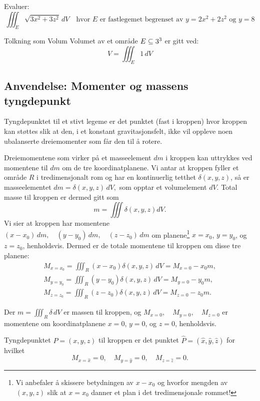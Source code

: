 \begin{eks}{}
Evaluer:
\[
\iiint_E \sqrt{3x^2 + 3z^2}\, dV \quad \text{hvor } E \text{ er fastlegemet begrenset av } y = 2x^2 + 2z^2 \text{ og } y = 8
\]
\end{eks}

\begin{rem}{Tolkning som Volum} Volumet av et område $E \subseteq 3^3$ er gitt ved:
\[
V = \iiint_E 1\, dV
\]
\end{rem}

\subsection*{Anvendelse: Momenter og massens tyngdepunkt}

Tyngdepunktet til et stivt legeme er det punktet (fast i kroppen) hvor kroppen kan støttes slik at den, i et konstant gravitasjonsfelt, ikke vil oppleve noen ubalanserte dreiemomenter som får den til å rotere.

Dreiemomentene som virker på et masseelement \( dm \) i kroppen kan uttrykkes ved momentene til \( dm \) om de tre koordinatplanene. Vi antar at kroppen fyller et område \( R \) i tredimensjonalt rom og har en kontinuerlig tetthet \( \delta(x, y, z) \), så er masseelementet
$
dm = \delta(x, y, z) \, dV,
$
som opptar et volumelement \( dV \). Total masse til kroppen er dermed gitt som 
\[m=\iiint \delta(x,y,z) dV.\]
Vi sier at kroppen har momentene
$(x - x_0) \, dm, \quad (y - y_0) \, dm, \quad (z - z_0) \, dm
$ om planene\footnote{Vi anbefaler å skissere betydningen av $x-x_0$ og hvorfor mengden av $(x,y,z)$ slik at $x=x_0$ danner et plan i det tredimensjonale rommet!} \( x = x_0 \), \( y = y_0 \), og \( z = z_0 \), henholdsvis.
Dermed er de totale momentene til kroppen om disse tre planene:
\begin{align*}
M_{x=x_0} =\iiint_R (x - x_0)\delta(x, y, z)\,dV = M_{x=0} - x_0 m,\\
M_{y=y_0} =\iiint_R (y - y_0)\delta(x, y, z)\,dV = M_{y=0} - y_0 m,\\
M_{z=z_0} =\iiint_R (z - z_0)\delta(x, y, z)\,dV = M_{z=0} - z_0 m.
\end{align*}

Der $m = \iiint_R \delta\, dV$ er massen til kroppen, og $M_{x = 0}, \quad M_{y = 0}, \quad M_{z = 0}$ er momentene om koordinatplanene \( x = 0 \), \( y = 0 \), og \( z = 0 \), henholdsvis.

Tyngdepunktet \( P = (x, y, z) \) til kroppen er det punktet $\hat{P} = (\hat{x},\hat{y},\hat{z})$ for hvilket
\[
M_{x=\hat{x}} = 0, \quad M_{y=\hat{y}} = 0, \quad M_{z=\hat{z}} = 0.
\]

